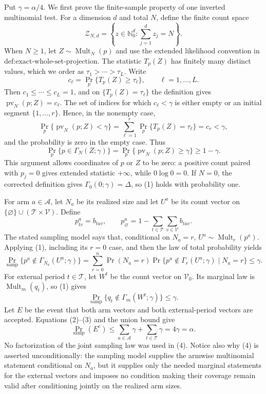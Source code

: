 Put \(\gamma=\alpha/4\). We first prove the finite-sample property of one inverted multinomial test. For a dimension \(d\) and total \(N\), define the finite count space
\[
 \mathcal Z_{N,d}=\left\{z\in\mathbb N_0^d:\sum_{j=1}^d z_j=N\right\}.
\]
When \(N\geq1\), let \(Z\sim\operatorname{Mult}_N(p)\) and use the extended likelihood convention in \(\text{def:exact-whole-set-projection}\). The statistic \(T_p(Z)\) has finitely many distinct values, which we order as \(\tau_1>\cdots>\tau_L\). Write
\[
 c_\ell=\Pr_p\{T_p(Z)\geq\tau_\ell\},\qquad \ell=1,\ldots,L.
\]
Then \(c_1\leq\cdots\leq c_L=1\), and on \(\{T_p(Z)=\tau_\ell\}\) the definition gives \(\operatorname{pv}_N(p;Z)=c_\ell\). The set of indices for which \(c_\ell<\gamma\) is either empty or an initial segment \(\{1,\ldots,r\}\). Hence, in the nonempty case,
\[
 \Pr_p\{\operatorname{pv}_N(p;Z)<\gamma\}
 =\sum_{\ell=1}^r\Pr_p\{T_p(Z)=\tau_\ell\}
 =c_r<\gamma,
\]
and the probability is zero in the empty case. Thus
\[
 \Pr_p\{p\in\Gamma_N(Z;\gamma)\}
 =\Pr_p\{\operatorname{pv}_N(p;Z)\geq\gamma\}
 \geq1-\gamma. \tag{1}
\]
This argument allows coordinates of \(p\) or \(Z\) to be zero: a positive count paired with \(p_j=0\) gives extended statistic \(+\infty\), while \(0\log0=0\). If \(N=0\), the corrected definition gives \(\Gamma_0(0;\gamma)=\Delta\), so (1) holds with probability one.

For arm \(a\in\mathcal A\), let \(N_a\) be its realized size and let \(U^a\) be its count vector on \(\{\varnothing\}\cup(\mathcal T\times\mathcal V)\). Define
\[
 p^a_{tv}=b_{tav},\qquad
 p^a_{\varnothing}=1-\sum_{t\in\mathcal T}\sum_{v\in\mathcal V}b_{tav}.
\]
The stated sampling model says that, conditional on \(N_a=r\), \(U^a\sim\operatorname{Mult}_r(p^a)\). Applying (1), including its \(r=0\) case, and then the law of total probability yields
\[
 \Pr_{\mathrm{samp}}\{p^a\notin\Gamma_{N_a}(U^a;\gamma)\}
 =\sum_{r=0}^n\Pr(N_a=r)
   \Pr\{p^a\notin\Gamma_r(U^a;\gamma)\mid N_a=r\}
 \leq\gamma. \tag{2}
\]
For external period \(t\in\mathcal T\), let \(W^t\) be the count vector on \(\mathcal V_0\). Its marginal law is \(\operatorname{Mult}_m(q_t)\), so (1) gives
\[
 \Pr_{\mathrm{samp}}\{q_t\notin\Gamma_m(W^t;\gamma)\}\leq\gamma. \tag{3}
\]
Let \(E\) be the event that both arm vectors and both external-period vectors are accepted. Equations (2)--(3) and the union bound give
\[
 \Pr_{\mathrm{samp}}(E^c)
 \leq\sum_{a\in\mathcal A}\gamma+\sum_{t\in\mathcal T}\gamma
 =4\gamma=\alpha. \tag{4}
\]
No factorization of the joint sampling law was used in (4). Notice also why (4) is asserted unconditionally: the sampling model supplies the armwise multinomial statement conditional on \(N_a\), but it supplies only the needed marginal statements for the external vectors and imposes no condition making their coverage remain valid after conditioning jointly on the realized arm sizes.

